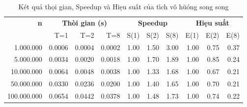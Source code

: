 \begin{table}[h!]
  \centering
  \caption{K\'{e}t qu\h{a} th\d{o}i gian, Speedup v\`{a} Hi\d{e}u su\'\^{a}t c\h{u}a t\'{\i}ch v\^{o} h\u{u}\'{o}ng song song}
  \label{tab:dot_benchmark}
  \vspace{0.2cm}
  \small
  \begin{tabular}{r|rrr|rrr|rrr}
    \toprule
    \textbf{n} & \multicolumn{3}{c|}{\textbf{Th\`{o}i gian (s)}} & \multicolumn{3}{c|}{\textbf{Speedup}} & \multicolumn{3}{c}{\textbf{Hi\d{e}u su\'\^{a}t}} \\
               & T=1 & T=2 & T=8 & S(1) & S(2) & S(8) & E(1) & E(2) & E(8) \\
    \midrule
    1.000.000 & 0.0006 & 0.0004 & 0.0002 & 1.00 & 1.50 & 3.00 & 1.00 & 0.75 & 0.37 \\
    5.000.000 & 0.0034 & 0.0020 & 0.0018 & 1.00 & 1.70 & 1.89 & 1.00 & 0.85 & 0.24 \\
    10.000.000 & 0.0064 & 0.0048 & 0.0038 & 1.00 & 1.33 & 1.68 & 1.00 & 0.67 & 0.21 \\
    50.000.000 & 0.0330 & 0.0236 & 0.0200 & 1.00 & 1.40 & 1.65 & 1.00 & 0.70 & 0.21 \\
    100.000.000 & 0.0654 & 0.0442 & 0.0378 & 1.00 & 1.48 & 1.73 & 1.00 & 0.74 & 0.22 \\
    \bottomrule
  \end{tabular}
\end{table}
